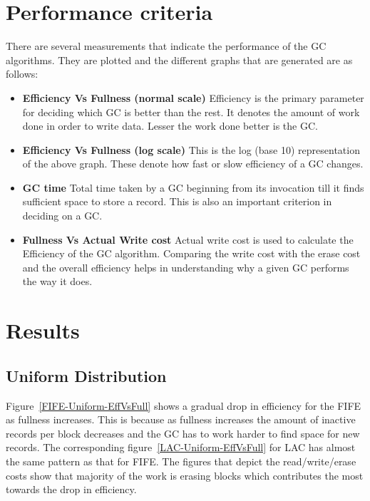 \section{Performance criteria}
	There are several measurements that indicate the performance of the GC algorithms. They are plotted and the different graphs that are generated are as follows:
\begin{itemize}
\item {\bf Efficiency Vs Fullness (normal scale)}
\subitem Efficiency is the primary parameter for deciding which GC is better than the rest. It denotes the amount of work done in order to write data. Lesser the work done better is the GC.
\item {\bf Efficiency Vs Fullness (log scale)}
\subitem This is the log (base 10) representation of the above graph. These denote how fast or slow efficiency of a GC changes. 
\item {\bf GC time}
\subitem Total time taken by a GC beginning from its invocation till it finds sufficient space to store a record. This is also an important criterion in deciding on a GC.
\item {\bf Fullness Vs Actual Write cost}
\subitem Actual write cost is used to calculate the Efficiency of the GC algorithm. Comparing the write cost with the erase cost and the overall efficiency helps in understanding why a given GC performs the way it does.
\end{itemize}

\section{Results}

\subsection{Uniform Distribution}
	Figure~\ref{FIFE-Uniform-EffVsFull} shows a gradual drop in efficiency for the FIFE as fullness increases. This is because as fullness increases the amount of inactive records per block decreases and the GC has to work harder to find space for new records. The corresponding figure~\ref{LAC-Uniform-EffVsFull} for LAC has almost the same pattern as that for FIFE. The figures that depict the read/write/erase costs show that majority of the work is erasing blocks which contributes the most towards the drop in efficiency.

